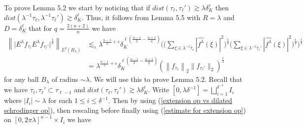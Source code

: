 \documentclass[11pt]{amsart}
\numberwithin{equation}{section}
\newcommand{\la}{\lambda}
\newcommand\norm[1]{\left\lVert#1\right\rVert}
\newcommand{\lpnorm}[3]{\norm{#1}_{L^{#2}(#3)}}
\newcommand{\altlpnorm}[2]{\norm{#1}_{#2}}
\newcommand{\extensionop}[2]{E_{#1}^{\la}{#2}}
\newcommand{\dK}[1]{\delta_{K}^{#1}}
\begin{document}
To prove Lemma 5.2 we start by noticing that if $dist(\tau_{\ell}, \tau_{\ell}') \gtrsim \la \dK{\ell}$ then $dist(\la^{-1}\tau_{\ell} , \la^{-1}\tau_{\ell}') \gtrsim \dK{\ell}$. Thus, it follows from Lemma 5.5 with $R = \la$ and $D = \dK{\ell}$ that for $q = \frac{2(n+2)}{n}$ we have
\begin{equation} \label{estimate for extension op}
\begin{split}
    \lpnorm{\big|\extensionop{}{f_{\tau_{\ell}}} \extensionop{}{f_{\tau_{\ell}'}}\big|^{\frac{1}{2}}}{q}{B_\la} &\lesssim_\varepsilon \la^{\frac{n-1}{2} + \varepsilon}\delta_{K}^{\ell(\frac{n-1}{2} - \frac{n+1}{q})}\Big(\big( \sum_{\xi \in \la^{-1}\tilde{\tau_{\ell}}}|\widehat{f^{\la}}(\xi)|^2 \big)^{\frac{1}{2}}\big( \sum_{\xi \in \la^{-1}\tilde{\tau_{\ell}}'}|\widehat{f^{\la}}(\xi)|^2 \big)^{\frac{1}{2}}\Big)^{\frac{1}{2}} \\
    &= \la^{\frac{n-1}{2} + \varepsilon}\delta_{K}^{\ell(\frac{n-1}{2} - \frac{n+1}{q})}\left( \altlpnorm{f_{\tau_{\ell}}}{2}  \lVert f_{\tau_{\ell}'} \rVert_{2}\right)^{\frac{1}{2}}
\end{split}
\end{equation}
for any ball $B_{\la}$ of radius $\sim \la$.
We will use this to prove Lemma 5.2. Recall that we have $\tau_{\ell} , \tau_{\ell}' \subset \tau_{\ell - 1}$ and $dist(\tau_{\ell}, \tau_{\ell}') \gtrsim \la \dK{\ell}$. Write $[0, \la \delta^{-1}] = \bigsqcup_{i = 1}^{\delta^{-1}}I_i$ where $|I_i| \sim \la$ for each $1 \leq i \leq \delta^{-1}$. Then by using (\ref{extension op vs dilated schrodinger op}), then rescaling before finally using (\ref{estimate for extension op}) on $[0,2 \pi \la]^{n-1} \times I_i$ we have
\end{document}
